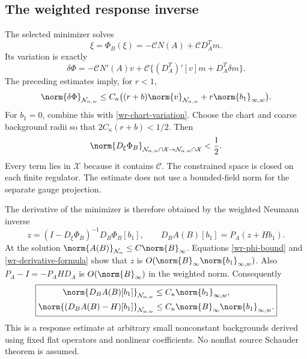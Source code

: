 \subsection{The weighted response inverse}
\label{wr-response-inverse}

The selected minimizer solves
\begin{equation}\label{wr-fixed-point}
 \xi=\Phi_B(\xi)=-\mathcal C N(A)+\mathcal C D_A^Tm.
\end{equation}
Its variation is exactly
\begin{equation}\label{wr-phi-variation}
 \delta\Phi=-\mathcal C N'(A)v
       +\mathcal C\{(D_A^T)'[v]m+D_A^T\delta m\}.
\end{equation}
The preceding estimates imply, for $r<1$,
\begin{equation}\label{wr-phi-bound}
 \norm{\delta\Phi}_{\mathcal N_{\alpha,w}}
 \le C_\kappa\bigl((r+b)\norm{v}_{\mathcal N_{\alpha,w}}
                            +r\norm{b_1}_{\infty,w}\bigr).
\end{equation}
For $b_1=0$, combine this with
\eqref{wr-chart-variation}. Choose the chart and coarse
background radii so that $2C_\kappa(r+b)<1/2$. Then
\begin{equation}\label{wr-weighted-contraction}
 \norm{D_\xi\Phi_B}_{\mathcal N_{\alpha,w}\cap\mathcal X
                         \to\mathcal N_{\alpha,w}\cap\mathcal X}
 <\frac12.
\end{equation}
Every term lies in $\mathcal X$ because it contains $\mathcal C$.
The constrained space is closed on each finite regulator. The
estimate does not use a bounded-field norm for the separate gauge
projection.

The derivative of the minimizer is therefore obtained by the
weighted Neumann inverse
\begin{equation}\label{wr-derivative-formula}
 z=(I-D_\xi\Phi_B)^{-1}D_B\Phi_B[b_1],\qquad
 D_BA(B)[b_1]=P_A(z+Hb_1).
\end{equation}
At the solution $\norm{A(B)}_{\mathcal N_\alpha}
\le C\norm{B}_\infty$. Equations \eqref{wr-phi-bound} and
\eqref{wr-derivative-formula} show that $z$ is
$O(\norm{B}_\infty\norm{b_1}_{\infty,w})$.
Also $P_A-I=-P_AHD_A$ is $O(\norm{B}_\infty)$ in the
weighted norm. Consequently
\begin{equation}\label{wr-main-response}
 \boxed{\begin{aligned}
 \norm{D_BA(B)[b_1]}_{\mathcal N_{\alpha,w}}
 &\le C_\kappa\norm{b_1}_{\infty,w},\\
 \norm{(D_BA(B)-H)[b_1]}_{\mathcal N_{\alpha,w}}
 &\le C_\kappa\norm{B}_\infty\norm{b_1}_{\infty,w}.
 \end{aligned}}
\end{equation}
This is a response estimate at arbitrary small nonconstant
backgrounds derived using fixed flat operators and nonlinear
coefficients. No nonflat source Schauder theorem is assumed.

